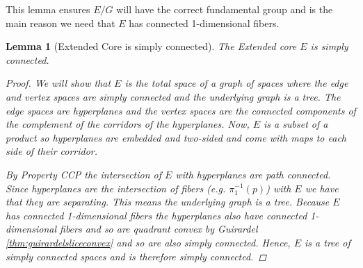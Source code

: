 \documentclass[12pt,parskip=full]{report}
\theoremstyle{plain}
\newtheorem{lem}[thm]{Lemma}
\theoremstyle{definition}
\begin{document}
This lemma ensures \(E/G\) will have the correct fundamental group and is the main reason we need that \(E\) has connected 1-dimensional fibers. 

\begin{lem}
    [Extended Core is simply connected]
    \label{lem:coresc} 
    The Extended core $E$ is simply connected.
    
    \begin{proof}
    
        
    
        We will show that $E$ is the total space of a graph of spaces where the edge and vertex spaces are simply connected and the underlying graph is a tree. The edge spaces are hyperplanes and the vertex spaces are the connected components of the complement of the corridors of the hyperplanes. Now, $E$ is a subset of a product so hyperplanes are embedded and two-sided and come with maps to each side of their corridor. 
        
        By Property CCP the intersection of $E$ with hyperplanes are path connected. Since hyperplanes are the intersection of fibers (e.g. $\pi_1^{-1}(p)$) with $E$ we have that they are separating. This means the underlying graph is a tree. Because $E$ has connected 1-dimensional fibers the hyperplanes also have connected 1-dimensional fibers and so are quadrant convex by Guirardel \ref{thm:guirardelsliceconvex} and so are also simply connected. Hence, $E$ is a tree of simply connected spaces and is therefore simply connected.
        
        




\end{proof}
\end{lem}
\end{document}
